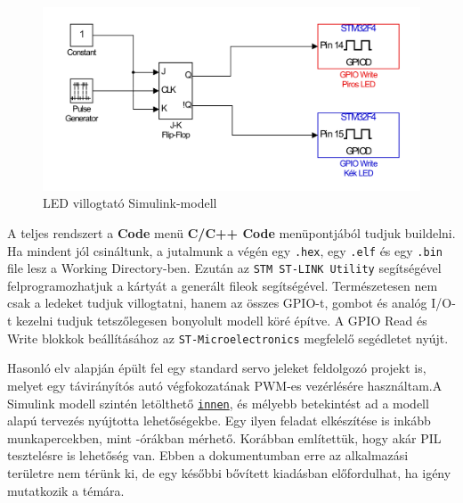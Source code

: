 \begin{figure}[!ht]
    \centering
    \includegraphics[width=0.9\linewidth]{img/stmblink}
    \caption{LED villogtató Simulink-modell}
    \label{fig:stmblink}
\end{figure}

A teljes rendszert a \textbf{Code} menü \textbf{C/C++ Code} menüpontjából tudjuk buildelni. Ha mindent jól csináltunk, a jutalmunk a végén egy \verb!.hex!, egy \verb!.elf! és egy \verb!.bin! file lesz a Working Directory-ben. Ezután az \texttt{STM ST-LINK Utility} segítségével felprogramozhatjuk a kártyát a generált fileok segítségével. Természetesen nem csak a ledeket tudjuk villogtatni, hanem az összes GPIO-t, gombot és analóg I/O-t kezelni tudjuk tetszőlegesen bonyolult modell köré építve. A GPIO Read és Write blokkok beállításához az \texttt{ST-Microelectronics} megfelelő segédletet nyújt\cite{usermanual}.

Hasonló elv alapján épült fel egy standard servo jeleket feldolgozó projekt is, melyet egy távirányítós autó végfokozatának PWM-es vezérlésére használtam.A Simulink modell szintén letölthető \href{http://www.mathworks.com/matlabcentral/fileexchange/46221-rc-car-control-with-stm32f4-discovery-programmed-by-matlab}{\texttt{innen}}, és mélyebb betekintést ad a modell alapú tervezés nyújtotta lehetőségekbe. Egy ilyen feladat elkészítése is inkább munkapercekben, mint -órákban mérhető.
Korábban említettük, hogy akár PIL tesztelésre is lehetőség van. Ebben a dokumentumban erre az alkalmazási területre nem térünk ki, de egy későbbi bővített kiadásban előfordulhat, ha igény mutatkozik a témára.